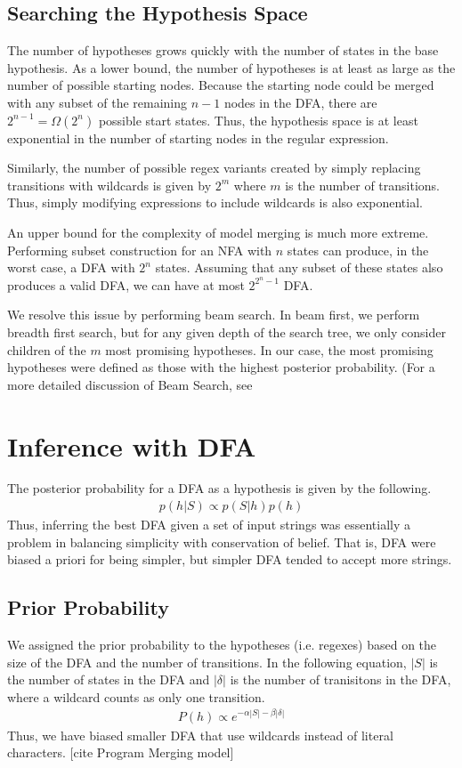 \documentclass[10pt,letterpaper]{article}
\begin{document}
\subsection{Searching the Hypothesis Space} The number of hypotheses grows quickly with the number of states in the base hypothesis. As a lower bound, the number of hypotheses is at least as large as the number of possible starting nodes. Because the starting node could be merged with any subset of the remaining $n-1$ nodes in the DFA, there are $2^{n-1}=\Omega(2^n)$ possible start states. Thus, the hypothesis space is at least exponential in the number of starting nodes in the regular expression.

Similarly, the number of possible regex variants created by simply replacing transitions with wildcards is given by $2^m$ where $m$ is the number of transitions. Thus, simply modifying expressions to include wildcards is also exponential.

An upper bound for the complexity of model merging is much more extreme. Performing subset construction for an NFA with $n$ states can produce, in the worst case, a DFA with $2^n$ states. Assuming that any subset of these states also produces a valid DFA, we can have at most $2^{2^n-1}$ DFA.

We resolve this issue by performing beam search. In beam first, we perform breadth first search, but for any given depth of the search tree, we only consider children of the $m$ most promising hypotheses. In our case, the most promising hypotheses were defined as those with the highest posterior probability. (For a more detailed discussion of Beam Search, see \cite{HwangStuhlmullerGoodman2011}


\section{Inference with DFA}
The posterior probability for a DFA as a hypothesis is given by the following.
\begin{align*}
	p(h|S) \propto p(S|h)p(h)
\end{align*}
Thus, inferring the best DFA given a set of input strings was essentially a problem in balancing simplicity with conservation of belief. That is, DFA were biased a priori for being simpler, but simpler DFA tended to accept more strings.

\subsection{Prior Probability}
We assigned the prior probability to the hypotheses (i.e. regexes) based on the size of the DFA and the number of transitions. In the following equation, $|S|$ is the number of states in the DFA and $|\delta|$ is the number of tranisitons in the DFA, where a wildcard counts as only one transition. 
\begin{align*}
	P(h) \propto e^{-\alpha|S| - \beta|\delta|}
\end{align*}
Thus, we have biased smaller DFA that use wildcards instead of literal characters. [cite Program Merging model]
\end{document}
